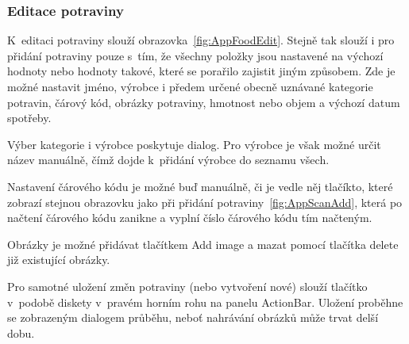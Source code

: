 \documentclass[thesis=B,czech]{FITthesis}[2013/10/20]
\begin{document}
\clearpage

\subsubsection{Editace potraviny}

K~editaci potraviny slouží obrazovka~\ref{fig:AppFoodEdit}. Stejně tak slouží i pro přidání potraviny pouze s~tím, že všechny položky jsou nastavené na výchozí hodnoty nebo hodnoty takové, které se porařilo zajistit jiným způsobem. Zde je možné nastavit jméno, výrobce i předem určené obecně uznávané kategorie potravin, čárový kód, obrázky potraviny, hmotnost nebo objem a výchozí datum spotřeby.

Výber kategorie i výrobce poskytuje dialog. Pro výrobce je však možné určit název manuálně, čímž dojde k~přidání výrobce do seznamu všech.

Nastavení čárového kódu je možné buď manuálně, či je vedle něj tlačíkto, které zobrazí stejnou obrazovku jako při přidání potraviny~\ref{fig:AppScanAdd}, která po načtení čárového kódu zanikne a vyplní číslo čárového kódu tím načteným.

Obrázky je možné přidávat tlačítkem Add image a mazat pomocí tlačítka delete již existující obrázky.

Pro samotné uložení změn potraviny (nebo vytvoření nové) slouží tlačítko v~podobě diskety v~pravém horním rohu na panelu ActionBar. Uložení proběhne se zobrazeným dialogem průběhu, neboť nahrávání obrázků může trvat delší dobu.
\end{document}
